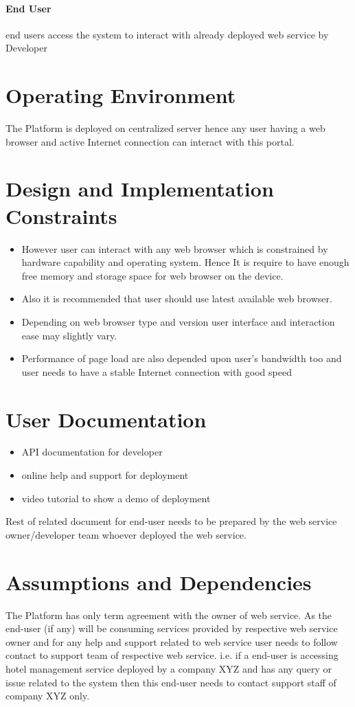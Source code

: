 \documentclass{report}
\begin{document}
\paragraph[endUser]{End User} end users access the system to interact with already deployed web service by Developer

\section{Operating Environment}
The Platform is deployed on centralized server hence any user having a web browser and active Internet connection can interact with this portal.

\section{Design and Implementation Constraints}
\begin{itemize}
	\item However user can interact with any web browser which is constrained by hardware capability and operating system. Hence It is require to have enough free memory and storage space for web browser on the device. 
	\item Also it is recommended that user should use latest available web browser.
	\item Depending on web browser type and version user interface and interaction ease may slightly vary.
	\item Performance of page load are also depended upon user's bandwidth too and user needs to have a stable Internet connection with good speed
\end{itemize}


\section{User Documentation}
\begin{itemize}
	\item API documentation for developer
	\item online help and support for deployment
	\item video tutorial to show a demo of deployment
\end{itemize}
Rest of related document for end-user needs to be prepared by the web service owner/developer team whoever deployed the web service.

\section{Assumptions and Dependencies}
The Platform has only term agreement with the owner of web service. As the end-user (if any) will be consuming services provided by respective web service owner and for any help and support related to web service user needs to follow contact to support team of respective web service. i.e. if a end-user is accessing hotel management service deployed by a company XYZ and has any query or issue related to the system then this end-user needs to contact support staff of company XYZ only.
\end{document}
